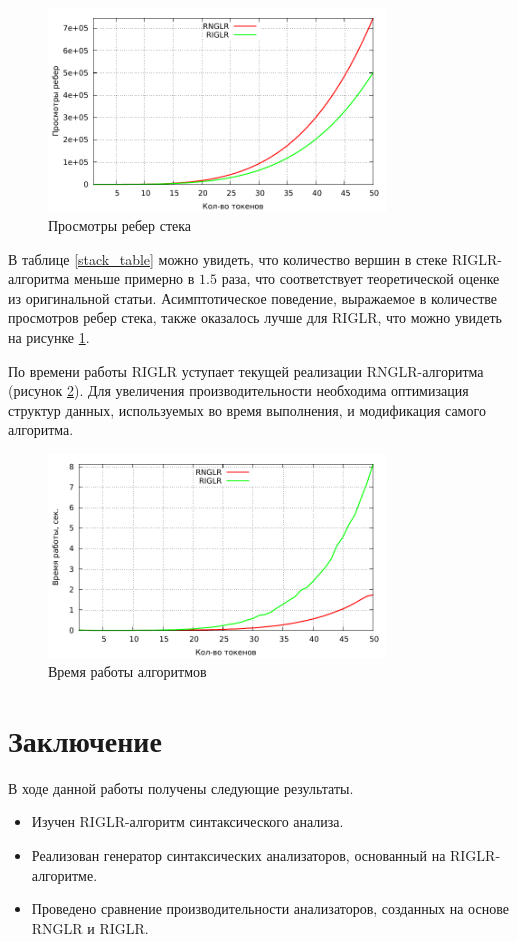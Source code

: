 \documentclass[14pt]{matmex-diploma-custom}
\begin{document}
\begin{figure}[h]
\centering
\includegraphics[width=0.8\textwidth]{pictures/edge_visit.pdf}
\caption{Просмотры ребер стека}
\label{edge_visit}
\end{figure} 

В таблице \ref{stack_table} можно увидеть, что количество вершин в стеке RIGLR-алгоритма меньше примерно в $1.5$ раза, что соответствует теоретической оценке из оригинальной статьи. Асимптотическое поведение, выражаемое в количестве просмотров ребер стека, также оказалось лучше для RIGLR, что можно увидеть на рисунке \ref{edge_visit}.

По времени работы RIGLR уступает текущей реализации RNGLR-алгоритма (рисунок \ref{time}). Для увеличения производительности необходима оптимизация структур данных, используемых во время выполнения, и модификация самого алгоритма.

\begin{figure}[h]
\centering
\includegraphics[width=0.8\textwidth]{pictures/time.pdf}
\caption{Время работы алгоритмов}
\label{time}
\end{figure}

\section*{Заключение}
В ходе данной работы получены следующие результаты.
\begin{itemize}
    \item Изучен RIGLR-алгоритм синтаксического анализа.
    \item Реализован генератор синтаксических анализаторов, основанный на RIGLR-алгоритме.
    \item Проведено сравнение производительности анализаторов, созданных на основе RNGLR и RIGLR.
\end{itemize}
\end{document}
